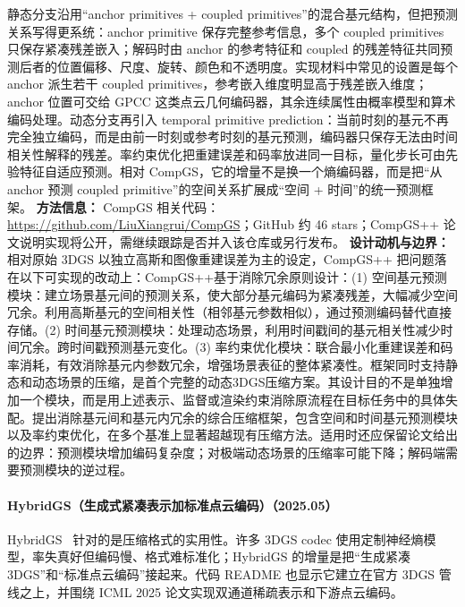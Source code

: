 静态分支沿用“anchor primitives + coupled primitives”的混合基元结构，但把预测关系写得更系统：anchor primitive 保存完整参考信息，多个 coupled primitives 只保存紧凑残差嵌入；解码时由 anchor 的参考特征和 coupled 的残差特征共同预测后者的位置偏移、尺度、旋转、颜色和不透明度。实现材料中常见的设置是每个 anchor 派生若干 coupled primitives，参考嵌入维度明显高于残差嵌入维度；anchor 位置可交给 GPCC 这类点云几何编码器，其余连续属性由概率模型和算术编码处理。动态分支再引入 temporal primitive prediction：当前时刻的基元不再完全独立编码，而是由前一时刻或参考时刻的基元预测，编码器只保存无法由时间相关性解释的残差。率约束优化把重建误差和码率放进同一目标，量化步长可由先验特征自适应预测。相对 CompGS，它的增量不是换一个熵编码器，而是把“从 anchor 预测 coupled primitive”的空间关系扩展成“空间 + 时间”的统一预测框架。
\textbf{方法信息：} CompGS 相关代码：\url{https://github.com/LiuXiangrui/CompGS}；GitHub 约 46 stars；CompGS++ 论文说明实现将公开，需继续跟踪是否并入该仓库或另行发布。
\textbf{设计动机与边界：} 相对原始 3DGS 以独立高斯和图像重建误差为主的设定，CompGS++ 把问题落在以下可实现的改动上：CompGS++基于消除冗余原则设计：(1) 空间基元预测模块：建立场景基元间的预测关系，使大部分基元编码为紧凑残差，大幅减少空间冗余。利用高斯基元的空间相关性（相邻基元参数相似），通过预测编码替代直接存储。(2) 时间基元预测模块：处理动态场景，利用时间戳间的基元相关性减少时间冗余。跨时间戳预测基元变化。(3) 率约束优化模块：联合最小化重建误差和码率消耗，有效消除基元内参数冗余，增强场景表征的整体紧凑性。框架同时支持静态和动态场景的压缩，是首个完整的动态3DGS压缩方案。其设计目的不是单独增加一个模块，而是用上述表示、监督或渲染约束消除原流程在目标任务中的具体失配。提出消除基元间和基元内冗余的综合压缩框架，包含空间和时间基元预测模块以及率约束优化，在多个基准上显著超越现有压缩方法。适用时还应保留论文给出的边界：预测模块增加编码复杂度；对极端动态场景的压缩率可能下降；解码端需要预测模块的逆过程。
\paragraph{HybridGS（生成式紧凑表示加标准点云编码）（2025.05）}
HybridGS~\cite{2505_01938} 针对的是压缩格式的实用性。许多 3DGS codec 使用定制神经熵模型，率失真好但编码慢、格式难标准化；HybridGS 的增量是把“生成紧凑 3DGS”和“标准点云编码”接起来。代码 README 也显示它建立在官方 3DGS 管线之上，并围绕 ICML 2025 论文实现双通道稀疏表示和下游点云编码。

